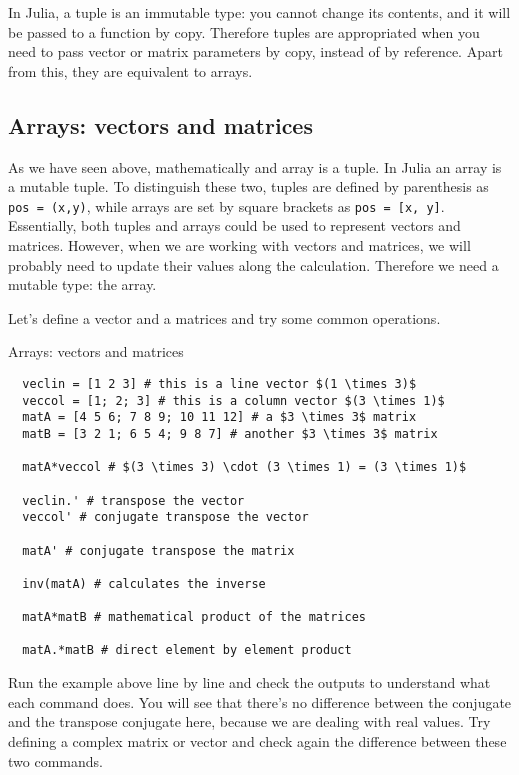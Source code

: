 In Julia, a tuple is an immutable type: you cannot change its contents, and it will be passed to a function by copy. Therefore tuples are appropriated when you need to pass vector or matrix parameters by copy, instead of by reference. Apart from this, they are equivalent to arrays.

\subsection{Arrays: vectors and matrices}

As we have seen above, mathematically and array is a tuple. In Julia an array is a mutable tuple. To distinguish these two, tuples are defined by parenthesis as \texttt{pos = (x,y)}, while arrays are set by square brackets as \texttt{pos = [x, y]}. Essentially, both tuples and arrays could be used to represent vectors and matrices. However, when we are working with vectors and matrices, we will probably need to update their values along the calculation. Therefore we need a mutable type: the array.

Let's define a vector and a matrices and try some common operations.

\begin{example}{Arrays: vectors and matrices}
\begin{verbatim}
  veclin = [1 2 3] # this is a line vector $(1 \times 3)$
  veccol = [1; 2; 3] # this is a column vector $(3 \times 1)$ 
  matA = [4 5 6; 7 8 9; 10 11 12] # a $3 \times 3$ matrix
  matB = [3 2 1; 6 5 4; 9 8 7] # another $3 \times 3$ matrix
  
  matA*veccol # $(3 \times 3) \cdot (3 \times 1) = (3 \times 1)$
  
  veclin.' # transpose the vector
  veccol' # conjugate transpose the vector
  
  matA' # conjugate transpose the matrix
  
  inv(matA) # calculates the inverse
  
  matA*matB # mathematical product of the matrices
  
  matA.*matB # direct element by element product
\end{verbatim}
\end{example}

Run the example above line by line and check the outputs to understand what each command does. You will see that there's no difference between the conjugate and the transpose conjugate here, because we are dealing with real values. Try defining a complex matrix or vector and check again the difference between these two commands.

